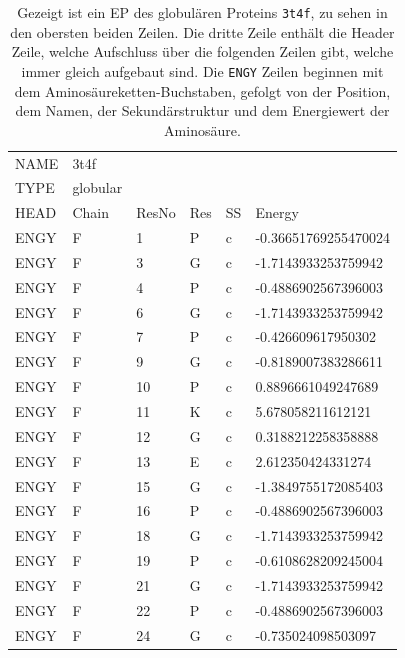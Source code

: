 \begin{table}[]
    \centering
    \caption{Gezeigt ist ein \acf{EP} des globulären Proteins \texttt{3t4f}, zu sehen in den obersten beiden Zeilen. Die dritte Zeile enthält die Header Zeile, welche Aufschluss über die folgenden Zeilen gibt, welche immer gleich aufgebaut sind. Die \texttt{ENGY} Zeilen beginnen mit dem Aminosäureketten-Buchstaben, gefolgt von der Position, dem Namen, der Sekundärstruktur und dem Energiewert der Aminosäure.}
    \label{tab:EP}
    \begin{tabular}{llllll}
    NAME & 3t4f &  &  &  &  \\
    TYPE & globular &  &  &  &  \\
    HEAD & Chain & ResNo & Res & SS & Energy \\
    ENGY & F & 1 & P & c & -0.36651769255470024 \\
    ENGY & F & 3 & G & c & -1.7143933253759942 \\
    ENGY & F & 4 & P & c & -0.4886902567396003 \\
    ENGY & F & 6 & G & c & -1.7143933253759942 \\
    ENGY & F & 7 & P & c & -0.426609617950302 \\
    ENGY & F & 9 & G & c & -0.8189007383286611 \\
    ENGY & F & 10 & P & c & 0.8896661049247689 \\
    ENGY & F & 11 & K & c & 5.678058211612121 \\
    ENGY & F & 12 & G & c & 0.3188212258358888 \\
    ENGY & F & 13 & E & c & 2.612350424331274 \\
    ENGY & F & 15 & G & c & -1.3849755172085403 \\
    ENGY & F & 16 & P & c & -0.4886902567396003 \\
    ENGY & F & 18 & G & c & -1.7143933253759942 \\
    ENGY & F & 19 & P & c & -0.6108628209245004 \\
    ENGY & F & 21 & G & c & -1.7143933253759942 \\
    ENGY & F & 22 & P & c & -0.4886902567396003 \\
    ENGY & F & 24 & G & c & -0.735024098503097
    \end{tabular}
\end{table}

